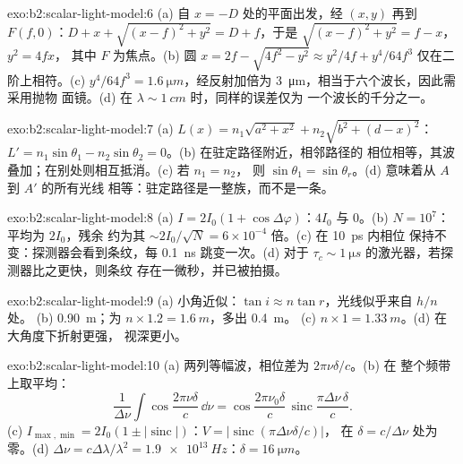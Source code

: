 \begin{solution}{exo:b2:scalar-light-model:6}
(a) 自 $x = -D$ 处的平面出发，经 $(x, y)$ 再到 $F(f, 0)$：$D + x
+ \sqrt{(x - f)^2 + y^2} = D + f$，于是 $\sqrt{(x - f)^2 + y^2} = f - x$，$y^2 = 4fx$，
其中 $F$ 为焦点。(b) 圆 $x = 2f - \sqrt{4f^2 - y^2} \approx y^2/4f +
y^4/64f^3$ 仅在二阶上相符。(c) $y^4/64f^3 = \qty{1.6}{\micro m}$，经反射加倍为
\qty{3}{\micro m}，相当于六个波长，因此需采用抛物
面镜。(d) 在 $\lambda \sim \qty{1}{cm}$ 时，同样的误差仅为
一个波长的千分之一。
\end{solution}

\begin{solution}{exo:b2:scalar-light-model:7}
(a) $L(x) = n_1\sqrt{a^2 + x^2} + n_2\sqrt{b^2 + (d - x)^2}$：$L' = n_1\sin\theta_1 -
n_2\sin\theta_2 = 0$。(b) 在驻定路径附近，相邻路径的
相位相等，其波叠加；在别处则相互抵消。(c) 若 $n_1 = n_2$，
则 $\sin\theta_1 = \sin\theta_r$。(d) 意味着从 $A$ 到 $A'$ 的所有光线
相等：驻定路径是一整族，而不是一条。
\end{solution}

\begin{solution}{exo:b2:scalar-light-model:8}
(a) $I = 2I_0(1 + \cos\Delta\varphi)$：$4I_0$ 与 $0$。(b) $N = 10^7$：平均为 $2I_0$，残余
约为其 $\sim 2I_0/\sqrt N = 6 \times 10^{-4}$ 倍。(c) 在 \qty{10}{ps} 内相位
保持不变：探测器会看到条纹，每 \qty{0.1}{ns} 跳变一次。(d) 对于
$\tau_c \sim \qty{1}{\micro s}$ 的激光器，若探测器比之更快，则条纹
存在一微秒，并已被拍摄。
\end{solution}

\begin{solution}{exo:b2:scalar-light-model:9}
(a) 小角近似：$\tan i \approx n\tan r$，光线似乎来自 $h/n$ 处。
(b) \qty{0.90}{m}；为 $n \times 1.2 = \qty{1.6}{m}$，多出 \qty{0.4}{m}。
(c) $n \times 1 = \qty{1.33}{m}$。(d) 在大角度下折射更强，
视深更小。
\end{solution}

\begin{solution}{exo:b2:scalar-light-model:10}
(a) 两列等幅波，相位差为 $2\pi\nu\delta/c$。(b) 在
整个频带上取平均：
\[
\frac1{\Delta\nu}\int\cos\frac{2\pi\nu\delta}c\,\dd\nu = \cos\frac{2\pi\nu_0\delta}c\,\operatorname{sinc}\frac{\pi\Delta\nu\,\delta}c .
\]
(c)
$I_{\max, \min} = 2I_0(1 \pm |\operatorname{sinc}|)$：$V = |\operatorname{sinc}(\pi\Delta\nu\delta/c)|$，
在 $\delta = c/\Delta\nu$ 处为零。(d) $\Delta\nu = c\Delta\lambda/\lambda^2 = \qty{1.9e13}{Hz}$：$\delta =
\qty{16}{\micro m}$。
\end{solution}


